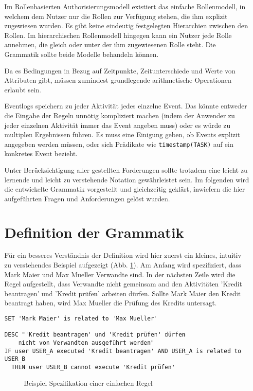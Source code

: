 Im Rollenbasierten Authorisierungsmodell existiert das einfache Rollenmodell, in welchem dem Nutzer nur die Rollen zur Verfügung stehen, die ihm explizit zugewiesen wurden. Es gibt keine eindeutig festgelegten Hierarchien zwischen den Rollen. Im hierarchischen Rollenmodell hingegen kann ein Nutzer jede Rolle annehmen, die gleich oder unter der ihm zugewiesenen Rolle steht. Die Grammatik sollte beide Modelle behandeln können.

Da es Bedingungen in Bezug auf Zeitpunkte, Zeitunterschiede und Werte von Attributen gibt, müssen zumindest grundlegende arithmetische Operationen erlaubt sein.

Eventlogs speichern zu jeder Aktivität jedes einzelne Event. Das könnte entweder die Eingabe der Regeln unnötig kompliziert machen (indem der Anwender zu jeder einzelnen Aktivität immer das Event angeben muss) oder es würde zu multiplen Ergebnissen führen. Es muss eine Einigung geben, ob Events explizit angegeben werden müssen, oder sich Prädikate wie \texttt{timestamp(TASK)} auf ein konkretes Event bezieht.

Unter Berücksichtigung aller gestellten Forderungen sollte trotzdem eine leicht zu lernende und leicht zu verstehende Notation gewährleistet sein. Im folgenden wird die entwickelte Grammatik vorgestellt und gleichzeitig geklärt, inwiefern die hier aufgeführten Fragen und Anforderungen gelöst wurden.
%
%
\section{Definition der Grammatik}
Für ein besseres Verständnis der Definition wird hier zuerst ein kleines, intuitiv zu verstehendes Beispiel aufgezeigt (Abb. \ref{fig:demorulefile}). Am Anfang wird spezifiziert, dass Mark Maier und Max Mueller Verwandte sind. In der nächsten Zeile wird die Regel aufgestellt, dass Verwandte nicht gemeinsam and den Aktivitäten 'Kredit beantragen' und 'Kredit prüfen' arbeiten dürfen. Sollte Mark Maier den Kredit beantragt haben, wird Max Mueller die Prüfung des Kredits untersagt.\\

\begin{verbatim}
SET 'Mark Maier' is related to 'Max Mueller'

DESC "'Kredit beantragen' und 'Kredit prüfen' dürfen 
	nicht von Verwandten ausgeführt werden"
IF user USER_A executed 'Kredit beantragen' AND USER_A is related to USER_B
  THEN user USER_B cannot execute 'Kredit prüfen'
\end{verbatim}
\begin{figure}[!h]
\caption{Beispiel Spezifikation einer einfachen Regel}
\label{fig:demorulefile}
\end{figure}


